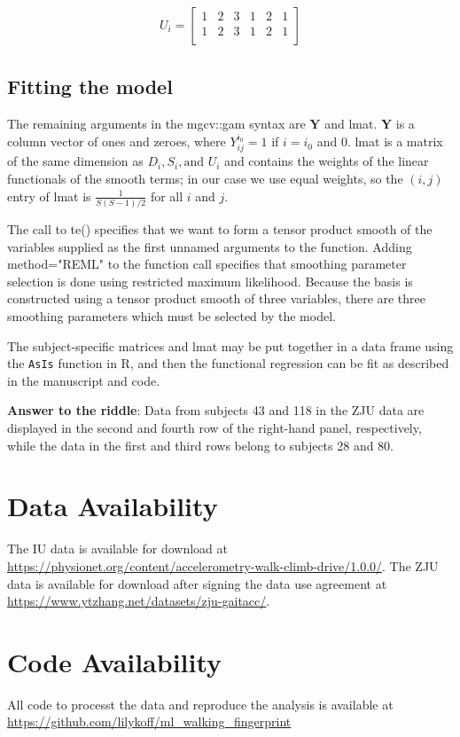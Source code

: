\begin{align*}
    \mathit{U}_i = 
   \begin{bmatrix}
   1 & 2 & 3 & 1 & 2 & 1\\
     1 & 2 & 3 & 1 & 2 & 1\\
    \end{bmatrix}
\end{align*}

\subsection{Fitting the model}
The remaining arguments in the {\ttfamily mgcv::gam} syntax are $\mathbf{Y}$ and {\ttfamily lmat}. $\mathbf{Y}$ is a column vector of ones and zeroes, where $Y_{ij}^{i_0}=1$ if $i=i_0$ and $0$. 
{\ttfamily lmat} is a matrix of the same dimension as $\mathit{D}_i, \mathit{S}_i, \text{and } \mathit{U}_i$ and contains the weights of the linear functionals of the smooth terms; in our case we use equal weights, so the $(i, j)$ entry of {\ttfamily lmat} is $\frac{1}{S(S-1)/2}$ for all $i$ and $j$. 

The call to {\ttfamily te()} specifies that we want to form a tensor product smooth of the variables supplied as the first unnamed arguments to the function. Adding {\ttfamily method="REML"} to the function call specifies that smoothing parameter selection is done using restricted maximum likelihood. Because the basis is constructed using a tensor product smooth of three variables, there are three smoothing parameters which must be selected by the model.

The subject-specific matrices and {\ttfamily lmat} may be put together in a data frame using the \texttt{AsIs} function in R, and then the functional regression can be fit as described in the manuscript and code.


\textbf{Answer to the riddle}:
Data from subjects 43 and 118 in the ZJU data are displayed in the second and fourth row of the right-hand panel, respectively, while the data in the first and third rows belong to subjects 28 and 80.

\section{Data Availability}
The IU data is available for download at \url{https://physionet.org/content/accelerometry-walk-climb-drive/1.0.0/}. The ZJU data is available for download after signing the data use agreement at \url{https://www.ytzhang.net/datasets/zju-gaitacc/}. 

\section{Code Availability}

All code to processt the data and reproduce the analysis is available  at \url{https://github.com/lilykoff/ml_walking_fingerprint}


